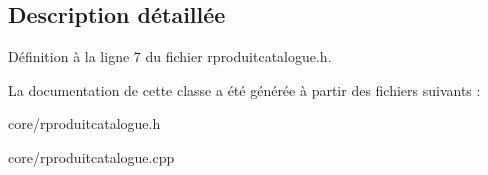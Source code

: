 \subsection{Description détaillée}


Définition à la ligne 7 du fichier rproduitcatalogue.h.



La documentation de cette classe a été générée à partir des fichiers suivants :\begin{DoxyCompactItemize}
\item 
core/rproduitcatalogue.h\item 
core/rproduitcatalogue.cpp\end{DoxyCompactItemize}
